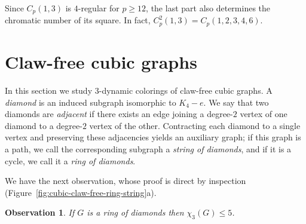 \documentclass[10pt,a4paper]{article}
\newtheorem{observation}[theorem] {Observation}
\theoremstyle{case}
\numberwithin{subcase}{case}
\begin{document}
Since $C_p(1,3)$ is $4$-regular for $p\ge12$, the last part also
determines the chromatic number of its square. In fact,
$
C^2_p(1,3)=C_p(1,2,3,4,6).
$


\section{Claw-free cubic graphs}

In this section we study $3$-dynamic colorings of claw-free cubic graphs.
A \emph{diamond} is an induced subgraph isomorphic to $K_4 - e$. 
We say that two diamonds are \emph{adjacent} if there exists an edge joining a degree-$2$ vertex of one diamond to a degree-$2$ vertex of the other. 
Contracting each diamond to a single vertex and preserving these adjacencies yields an auxiliary graph; if this graph is a path, we call the corresponding subgraph a \emph{string of diamonds}, and if it is a cycle, we call it a \emph{ring of diamonds}.


We have the next observation, whose proof is direct by inspection
(Figure~\ref{fig:cubic-claw-free-ring-string}a).

\begin{observation}\label{obs:ringX3leq5}
    If $G$ is a ring of diamonds then $\chi_3(G) \leq 5$.
\end{observation}
\end{document}
